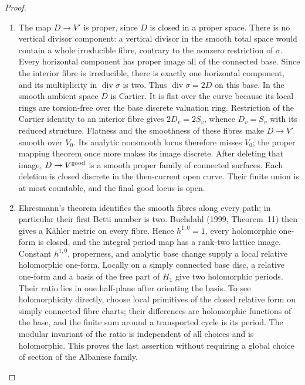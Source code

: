 \begin{proof}
\begin{enumerate}[label=\arabic*.,leftmargin=*]
\item The map \(D\to V'\) is proper, since \(D\) is closed in a proper
space. There is no vertical divisor component: a vertical divisor in
the smooth total space would contain a whole irreducible fibre,
contrary to the nonzero restriction of \(\sigma\). Every horizontal
component has proper image all of the connected base. Since the
interior fibre is irreducible, there is exactly one horizontal
component, and its multiplicity in \(\operatorname{div}\sigma\) is
two. Thus \(\operatorname{div}\sigma=2D\) on this base. In the smooth
ambient space \(D\) is Cartier. It is flat over the curve because
its local rings are torsion-free over the base discrete valuation
ring. Restriction of the Cartier identity to an interior fibre gives
\(2D_v=2S_v\), whence \(D_v=S_v\) with its reduced structure.
Flatness and the smoothness of these fibres make \(D\to V'\) smooth
over \(V_0\). Its analytic nonsmooth locus therefore misses \(V_0\);
the proper mapping theorem once more makes its image discrete.
After deleting that image, \(D\to V^{\rm good}\) is a smooth proper
family of connected surfaces. Each deletion is closed discrete in the
then-current open curve. Their finite union is at most countable,
and the final good locus is open.

\item Ehresmann's theorem identifies the smooth fibres along every path;
in particular their first Betti number is two. Buchdahl (1999,
Theorem~11) then gives a K\"ahler metric on every fibre. Hence
\(h^{1,0}=1\), every holomorphic one-form is closed, and the integral
period map has a rank-two lattice image. Constant \(h^{1,0}\),
properness, and analytic base change supply a local relative
holomorphic one-form. Locally on a simply connected
base disc, a relative one-form and a basis of the free part of
\(H_1\) give two holomorphic periods. Their ratio lies in one
half-plane after orienting the basis. To see holomorphicity directly,
choose local primitives of the closed relative form on simply
connected fibre charts; their differences are holomorphic functions
of the base, and the finite sum around a transported cycle is its
period. The modular invariant of the ratio is independent of all
choices and is holomorphic. This proves the last assertion without
requiring a global choice of section of the Albanese family.
\end{enumerate}
\end{proof}
